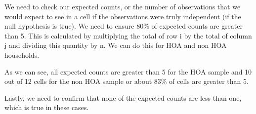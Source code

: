 \documentclass{article}
\begin{document}
We need to check our expected counts, or the number of observations that we would expect to see in a cell if the observations were truly independent (if the null hypothesis is true). We need to ensure 80\% of expected counts are greater than 5. This is calculated by multiplying the total of row i by the total of column j and dividing this quantity by n. We can do this for HOA and non HOA households. 
\newline
{}

As we can see, all expected counts are greater than 5 for the HOA sample and 10 out of 12 cells for the non HOA sample or about 83\% of cells are greater than 5.

Lastly, we need to confirm that none of the expected counts are less than one, which is true in these cases. 
\end{document}
